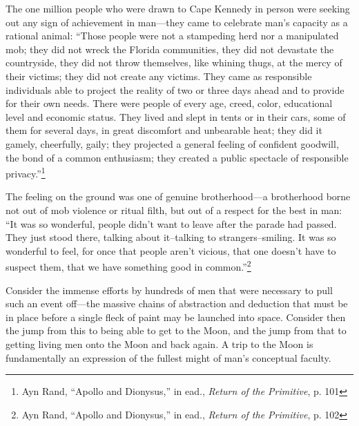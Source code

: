 \documentclass[11pt]{article}
\begin{document}
The one million people who were drawn to Cape Kennedy in person were seeking out any sign of achievement in man---they came to celebrate man's capacity as a rational animal: ``Those people were not a stampeding herd nor a manipulated mob; they did not wreck the Florida communities, they did not devastate the countryside, they did not throw themselves, like whining thugs, at the mercy of their victims; they did not create any victims. They came as responsible individuals able to project the reality of two or three days ahead and to provide for their own needs. There were people of every age, creed, color, educational level and economic status. They lived and slept in tents or in their cars, some of them for several days, in great discomfort and unbearable heat; they did it gamely, cheerfully, gaily; they projected a general feeling of confident goodwill, the bond of a common enthusiasm; they created a public spectacle of responsible privacy.''\footnote{Ayn Rand, ``Apollo and Dionysus,'' in ead., \emph{Return of the Primitive}, p. 101}

The feeling on the ground was one of genuine brotherhood---a brotherhood borne not out of mob violence or ritual filth, but out of a respect for the best in man: ``It was so wonderful, people didn't want to leave after the parade had passed. They just stood there, talking about it--talking to strangers--smiling. It was so wonderful to feel, for once that people aren't vicious, that one doesn't have to suspect them, that we have something good in common.''\footnote{Ayn Rand, ``Apollo and Dionysus,'' in ead., \emph{Return of the Primitive}, p. 102}

Consider the immense efforts by hundreds of men that were necessary to pull such an event off---the massive chains of abstraction and deduction that must be in place before a single fleck of paint may be launched into space. Consider then the jump from this to being able to get to the Moon, and the jump from that to getting living men onto the Moon and back again. A trip to the Moon is fundamentally an expression of the fullest might of man's conceptual faculty.
\end{document}
